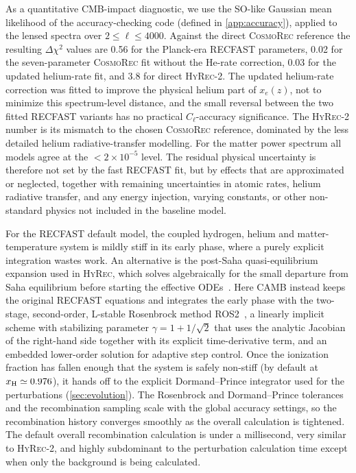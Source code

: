 \documentclass[prd, twocolumn, superscriptaddress, tightenlines, longbibliography, nofootinbib, eqsecnum, amsfonts, amsmath, floatfix, notitlepage]{revtex4-2}
\begin{document}
As a quantitative CMB-impact diagnostic, we use the SO-like Gaussian mean
likelihood of the accuracy-checking code (defined in \cref{app:accuracy}),
applied to the lensed spectra over $2\le \ell\le4000$.
Against the direct \textsc{CosmoRec} reference the resulting $\Delta\chi^2$
values are 0.56 for the Planck-era \textsc{RECFAST} parameters, 0.02 for the
seven-parameter \textsc{CosmoRec} fit without the He-rate correction, 0.03 for
the updated helium-rate fit, and 3.8 for direct \textsc{HyRec-2}. The updated
helium-rate correction was fitted to improve the physical helium part of
\(x_e(z)\), not to minimize this spectrum-level distance, and the small reversal
between the two fitted \textsc{RECFAST} variants has no practical
\(C_\ell\)-accuracy significance. The \textsc{HyRec-2} number is its mismatch to
the chosen \textsc{CosmoRec} reference, dominated by the less detailed helium
radiative-transfer modelling. For the matter power spectrum all models agree at the
$< 2\times 10^{-5}$ level.
The residual physical uncertainty is therefore not set by the fast
\textsc{RECFAST} fit, but by effects that are approximated or neglected,
together with remaining uncertainties in atomic rates, helium radiative transfer,
and any energy injection, varying constants, or other non-standard
physics not included in the baseline model.

For the \textsc{RECFAST} default model, the coupled hydrogen, helium and matter-temperature
system is mildly stiff in its early phase, where a purely explicit integration
wastes work. An alternative is the post-Saha quasi-equilibrium expansion used in
\textsc{HyRec}, which solves algebraically for the small departure from Saha
equilibrium before starting the effective ODEs~\cite{AliHaimoud:2010dx}. Here
\textsc{CAMB} instead keeps the original \textsc{RECFAST} equations and
integrates the early phase with the two-stage, second-order, L-stable Rosenbrock
method ROS2~\cite{Rosenbrock:1963,Verwer:1999}, a linearly implicit scheme with
stabilizing parameter $\gamma = 1 + 1/\sqrt{2}$ that uses the analytic Jacobian
of the right-hand side together with its explicit time-derivative term, and an
embedded lower-order solution for adaptive step control. Once the ionization
fraction has fallen enough that the system is safely
non-stiff (by default at $x_{\rm H}\simeq 0.976$), it hands off to the explicit
Dormand--Prince integrator used for the perturbations (\cref{sec:evolution}).
The Rosenbrock and Dormand--Prince tolerances and the
recombination sampling scale with the global accuracy settings, so the
recombination history converges smoothly as the overall calculation is tightened.
The default overall recombination calculation is under a millisecond, very similar
to \textsc{HyRec-2}, and highly subdominant to the perturbation calculation time
except when only the background is being calculated.
\end{document}
